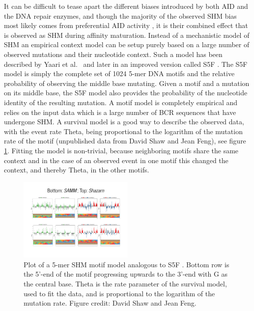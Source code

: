 It can be difficult to tease apart the different biases introduced by both AID and the DNA repair enzymes, and though the majority of the observed SHM bias most likely comes from preferential AID activity \cite{Pham_2016}, it is their combined effect that is observed as SHM during affinity maturation.
Instead of a mechanistic model of SHM an empirical context model can be setup purely based on a large number of observed mutations and their nucleotide context.
Such a model has been described by Yaari et al.\ \cite{yaari2013models} and later in an improved version called S5F \cite{cui2016model}.
The S5F model is simply the complete set of 1024 5-mer DNA motifs and the relative probability of observing the middle base mutating.
Given a motif and a mutation on its middle base, the S5F model also provides the probability of the nucleotide identity of the resulting mutation.
A motif model is completely empirical and relies on the input data which is a large number of BCR sequences that have undergone SHM.
A survival model \cite{cox1992regression} is a good way to describe the observed data, with the event rate Theta, being proportional to the logarithm of the mutation rate of the motif (unpublished data from David Shaw and Jean Feng), see figure \ref{fig:SAMM_plot}.
Fitting the model is non-trivial, because neighboring motifs share the same context and in the case of an observed event in one motif this changed the context, and thereby Theta, in the other motifs.

\begin{figure}
    \centering
    \includegraphics[width=0.5\textwidth]{figures/SAMM_plot.pdf}
    \caption{
        \label{fig:SAMM_plot}
        Plot of a 5-mer SHM motif model analogous to S5F \cite{cui2016model}. Bottom row is the 5'-end of the motif progressing upwards to the 3'-end with G as the central base. Theta is the rate parameter of the survival model, used to fit the data, and is proportional to the logarithm of the mutation rate.
        Figure credit: David Shaw and Jean Feng.
    }
\end{figure}










